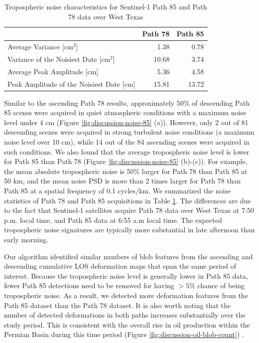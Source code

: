 \begin{table}[h]
	\centering
	\caption{Tropospheric noise characteristics for Sentinel-1 Path 85 and Path 78 data over West Texas}
	\begin{tabular}{lrr}
		\toprule
		{} &  Path 78 &  Path 85 \\
		\midrule
		Average Variance [cm$^2$]             &     1.38 &     0.78 \\
		Variance of the Noisiest Date [cm$^2$] &    10.68 &     3.74 \\
		Average Peak Amplitude [cm]            &     5.36 &     4.58 \\
		Peak Amplitude of the Noisiest Date [cm]         &    15.81 &    13.72 \\
		\bottomrule
	\end{tabular}
	\label{tab:path85-compare}
\end{table}

Similar to the ascending Path 78 results, approximately 50\% of descending Path 85 scenes were acquired in quiet atmospheric conditions with a maximum noise level under 4 cm (Figure \ref{fig:discussion-noise-85} (a)). However, only 2 out of 81 descending scenes were acquired in strong turbulent noise conditions (a maximum noise level over 10 cm), while 14 out of the 84 ascending scenes were acquired in such conditions. We also found that the average tropospheric noise level is lower for Path 85 than Path 78 (Figure \ref{fig:discussion-noise-85} (b)-(c)). For example, the mean absolute tropospheric noise is 50\% larger for Path 78 than Path 85 at 50 km, and the mean noise PSD is more than 2 times larger for Path 78 than Path 85 at a spatial frequency of 0.1 cycles/km. We summarized the noise statistics of Path 78 and Path 85 acquisitions in Table \ref{tab:path85-compare}. The differences are due to the fact that Sentinel-1 satellites acquire Path 78 data over West Texas at 7:50 p.m. local time, and Path 85 data at 6:55 a.m local time. The expected tropospheric noise signatures are typically more substantial in late afternoon than early morning. 




Our algorithm identified similar numbers of blob features from the ascending and descending cumulative LOS deformation maps that span the same period of interest. Because the tropospheric noise level is generally lower in Path 85 data, fewer Path 85 detections need to be removed for having $>5\%$ chance of being tropospheric noise. As a result, we detected more deformation features from the Path 85 dataset than the Path 78 dataset. It is also worth noting that the number of detected deformations in both paths increases substantially over the study period. This is consistent with the overall rise in oil production within the Permian Basin during this time period (Figure \ref{fig:discussion-oil-blob-count}) .




